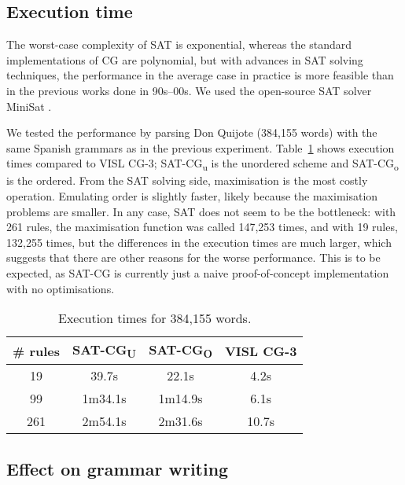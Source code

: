 \subsection{Execution time}

The worst-case complexity of SAT is exponential, whereas the standard
implementations of CG are polynomial, but with advances in SAT solving
techniques, the performance in the average case in practice is more feasible than in the previous works done in 90s--00s.
We used the open-source SAT solver MiniSat \cite{een04sat}.


We tested the performance by parsing Don Quijote (384,155 words) with
the same Spanish grammars as in the previous experiment. 
Table~\ref{table:time} shows execution times compared to VISL CG-3;
SAT-CG\textsubscript{u} is the unordered scheme and
SAT-CG\textsubscript{o} is the ordered.
From the SAT solving side, maximisation is the most costly operation. 
Emulating order is slightly faster, likely because the maximisation problems are smaller.
In any case, SAT does not seem to be the bottleneck: with 261 rules,
the maximisation function was called 147,253 times, and with 19 rules,
132,255 times, but 
the differences in the execution times are much larger, which suggests
that there are other reasons for the worse performance. 
This is to be expected, as SAT-CG is currently just a naive
proof-of-concept implementation with no optimisations.

\begin{table}
  \centering
  \begin{tabular}{|c|c|c|c|}
     \hline
     \textbf{\# rules} &  \textbf{SAT-CG\textsubscript{U}} & \textbf{SAT-CG\textsubscript{O}} & \textbf{VISL CG-3} \\ \hline
      19   & 39.7s &  22.1s   & 4.2s\\ %
      99   & 1m34.1s & 1m14.9s & 6.1s \\ %
      261  & 2m54.1s & 2m31.6s & 10.7s \\ \hline
  \end{tabular}
  \caption{Execution times for 384,155 words.}
  \label{table:time}
\end{table}

\subsection{Effect on grammar writing}

